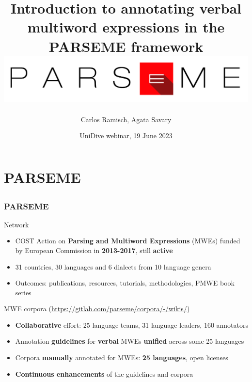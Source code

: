 \documentclass[xcolor=dvipsnames]{beamer}
\title[PARSEME Intro]{Introduction to annotating verbal multiword expressions in the PARSEME framework\\\includegraphics[scale=0.3]{Images/parseme-logo.png}}
\author{Carlos Ramisch, Agata Savary}
\institute[shortinst]{Aix-Marseille Université, Université Paris-Saclay, France}
\date[UniDive, 19/06/2023]{UniDive webinar, 19 June 2023}
\begin{document}
\begin{frame}

\titlepage
\end{frame}

\section{PARSEME} 
\subsection{}

\begin{frame}
  \frametitle{PARSEME}
  
\begin{scriptsize}
  
\begin{block}{Network}
\begin{itemize}
\item COST Action on \textbf{Parsing and Multiword Expressions} (MWEs) funded by European Commission in \textbf{2013-2017}, still \textbf{active}
\item 31 countries, 30 languages and 6 dialects from 10 language genera
\item Outcomes: publications, resources, tutorials, methodologies, PMWE book series 
\end{itemize}
\end{block}

\begin{block}{MWE corpora (\textcolor{magenta}{\url{https://gitlab.com/parseme/corpora/-/wikis/}})}
\begin{itemize}
\item \textbf{Collaborative} effort: 25 language teams, 31 language leaders, 160 annotators
\item Annotation \textbf{guidelines} for \textbf{verbal} MWEs \textbf{unified} across some 25 languages
\item Corpora \textbf{manually} annotated for MWEs: \textbf{25 languages}, open licenses
\item \textbf{Continuous enhancements} of the guidelines and corpora
\end{itemize}
\end{block}

\end{scriptsize}


\end{frame}
\end{document}
